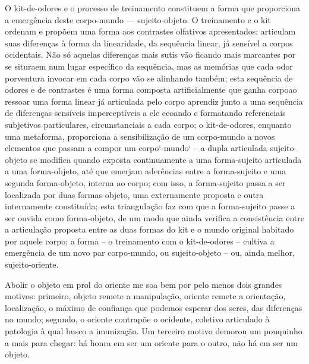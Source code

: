 O kit-de-odores e o processo de treinamento constituem a forma que proporciona a emergência deste corpo-mundo --- sujeito-objeto. O treinamento e o kit ordenam e propõem uma forma aos contrastes olfativos apresentados; articulam suas diferenças à forma da linearidade, da sequência linear, já sensível a corpos ocidentais. Não só aquelas diferenças mais sutis vão ficando mais marcantes por se situraem num lugar específico da sequência, mas as memórias que cada odor porventura invocar em cada corpo vão se alinhando também; esta sequência de odores e de contrastes é uma forma composta artificialmente que \guillemetleft ganha corpo\guillemetright ao ressoar uma forma linear já articulada pelo corpo aprendiz junto a uma sequência de diferenças sensíveis imperceptíveis a ele ecoando e formatando referenciais subjetivos particulares, circunstanciais a cada corpo; o kit-de-odores, enquanto uma metaforma, proporciona a sensibilização de um corpo-mundo a novos elementos que passam a compor um corpo`-mundo` -- a dupla articulada sujeito-objeto se modifica quando exposta continuamente a uma forma-sujeito articulada a uma forma-objeto, até que emerjam aderências entre a forma-sujeito e uma segunda forma-objeto, interna ao corpo; com isso, a forma-sujeito passa a ser localizada por duas formas-objeto, uma externamente proposta e outra internamente constituída; esta triangulação faz com que a forma-sujeito passe a ser ouvida como forma-objeto, de um modo que ainda verifica a consistência entre a articulação proposta entre as duas formas do kit e o mundo original habitado por aquele corpo; a forma -- o treinamento com o kit-de-odores -- cultiva a emergência de um novo par corpo-mundo, ou sujeito-objeto -- ou, ainda melhor, sujeito-oriente.

Abolir o objeto em prol do oriente me soa bem por pelo menos dois grandes motivos: primeiro, objeto remete a manipulação, oriente remete a orientação, localização, o máximo de confiança que podemos esperar dos seres, das diferenças no mundo; segundo, o oriente contrapõe o ocidente, coletivo articulado à patologia à qual busco a imunização. Um terceiro motivo demorou um pouquinho a mais para chegar: há honra em ser um oriente para o outro, não há em ser um objeto.

